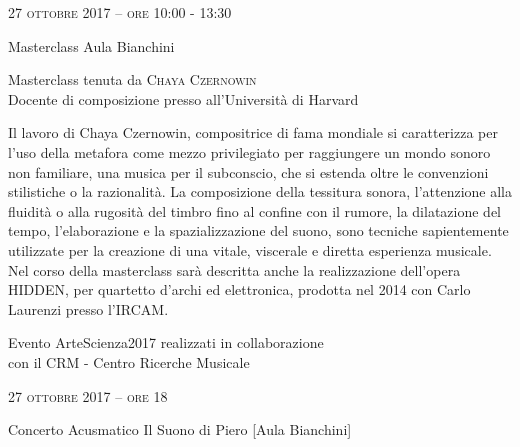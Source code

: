 
\begin{flushright}

\large{
	\scshape{
	27 ottobre 2017 -- ore 10:00 - 13:30
	}}

\medskip
	
\small{Masterclass
	\newline Aula Bianchini}

\medskip

{\fontsize{20}{20} }

\normalfont

\normalsize

\bigskip

Masterclass tenuta da \textsc{Chaya Czernowin}\\{\footnotesize Docente di composizione presso all'Università di Harvard}


\bigskip

Il lavoro di Chaya Czernowin, compositrice di fama mondiale si caratterizza per l’uso della metafora come mezzo privilegiato per raggiungere un mondo sonoro non familiare, una musica per il subconscio, che si estenda oltre le convenzioni stilistiche o la razionalità. La composizione della tessitura sonora, l’attenzione alla fluidità o alla rugosità del timbro fino al confine con il rumore, la dilatazione del tempo, l’elaborazione e la spazializzazione del suono, sono tecniche sapientemente utilizzate per la creazione di una vitale, viscerale e diretta esperienza musicale. Nel corso della masterclass sarà descritta anche la realizzazione dell’opera HIDDEN, per quartetto d’archi ed elettronica, prodotta nel 2014 con Carlo Laurenzi presso l’IRCAM.

\bigskip

\small{Evento ArteScienza2017 realizzati in collaborazione\\con il CRM - Centro Ricerche Musicale}

\vfill

\large{
	\scshape{
	27 ottobre 2017 -- ore 18
	}}

\medskip

\small{Concerto Acusmatico
	\newline Il Suono di Piero [Aula Bianchini]}

\medskip


{\fontsize{20}{20} }


\end{flushright}
